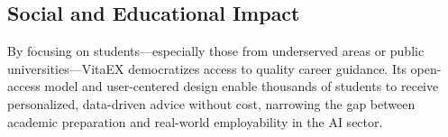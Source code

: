 \documentclass[runningheads]{llncs}
\begin{document}
\subsection*{Social and Educational Impact}

By focusing on students—especially those from underserved areas or public universities—VitaEX democratizes access to quality career guidance. Its open-access model and user-centered design enable thousands of students to receive personalized, data-driven advice without cost, narrowing the gap between academic preparation and real-world employability in the AI sector.

	
	
\makeatletter
\renewcommand{\@biblabel}[1]{#1.} 
\makeatother


%

\end{document}

